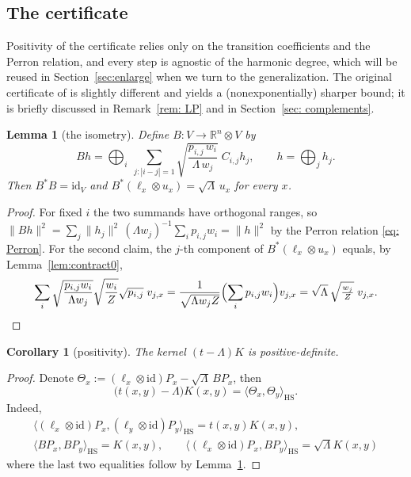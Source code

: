 \documentclass[11pt]{amsart}
\theoremstyle{plain}
\newtheorem{lemma}[theorem]{Lemma}
\newtheorem{corollary}[theorem]{Corollary}
\theoremstyle{remark}
\newcommand{\R}{\mathbb{R}}
\newcommand{\la}{\langle}
\newcommand{\ra}{\rangle}
\begin{document}
\subsection{The certificate}

Positivity of the certificate relies only on the transition coefficients
and the Perron relation, and every step is agnostic of the harmonic degree, which will be reused
in Section~\ref{sec:enlarge} when we turn to the generalization. The
original certificate of \cite{BN06} is slightly different and yields a
(nonexponentially) sharper bound; it is briefly discussed in Remark~\ref{rem: LP} and in Section~\ref{sec: complements}.

\begin{lemma}[the isometry]\label{lem:B}
Define $B\colon V\to\R^n\otimes V$ by
\[
 Bh=\bigoplus_{i}\ \sum_{j:|i-j|=1}
 \sqrt{\frac{p_{i,j}\,w_i}{\Lambda\,w_j}}\;C_{i,j}h_j ,
 \qquad h=\bigoplus_jh_j .
\]
Then $B^{*}B=\mathrm{id}_V$ and $B^{*}(\ell_x\otimes u_x)=\sqrt\Lambda\,u_x$
for every $x$.
\end{lemma}

\begin{proof}
For fixed $i$ the two summands have orthogonal ranges, so
$\|Bh\|^2=\sum_j\|h_j\|^2\,(\Lambda w_j)^{-1}\sum_ip_{i,j}w_i=\|h\|^2$ by the
Perron relation \eqref{eq: Perron}. For the second claim, the $j$-th component of
$B^{*}(\ell_x\otimes u_x)$ equals, by Lemma~\ref{lem:contract0},
\[
 \sum_i\sqrt{\frac{p_{i,j}w_i}{\Lambda w_j}}\sqrt{\frac{w_i}{Z}}\sqrt{p_{i,j}}
 \;v_{j,x}
 =\frac{1}{\sqrt{\Lambda w_jZ}}\Bigl(\sum_ip_{i,j}w_i\Bigr)v_{j,x}
 =\sqrt{\Lambda}\,\sqrt{\tfrac{w_j}{Z}}\;v_{j,x}. \qedhere
\]
\end{proof}

\begin{corollary}[positivity]\label{cor:posdef} The kernel $(t-\Lambda)K$ is positive-definite.
\end{corollary}
\begin{proof} Denote $\Theta_x:=(\ell_x\otimes\mathrm{id})P_x-\sqrt\Lambda\,BP_x$, then
\[
 \bigl(t(x,y)-\Lambda\bigr)K(x,y)=\la\Theta_x,\Theta_y\ra_{\mathrm {HS}}. 
\]
Indeed, 
\begin{gather*}
\la (\ell_x\otimes\mathrm{id})P_x,(\ell_y\otimes\mathrm{id})P_y\ra_{\mathrm {HS}}=t(x,y) K(x,y),\\
\la BP_x, BP_y\ra_{\mathrm {HS}}=K(x,y),\qquad\la (\ell_x\otimes\mathrm{id})P_x,BP_y\ra_{\mathrm{HS}}=
\sqrt\Lambda K(x,y)
\end{gather*}
where the last two equalities follow by Lemma~\ref{lem:B}.
\end{proof}
\end{document}
